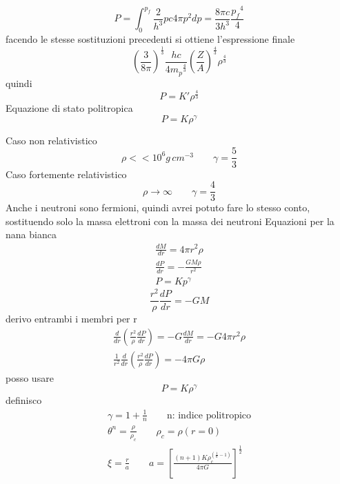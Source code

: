 \begin{enumerate}
\begin{equation*}
        P = \int_0^{p_f} \frac{2}{h^3}pc4\pi p^2 dp = \frac{8\pi c}{3h^3}\frac{{p_f}^4}{4}
    \end{equation*}
    facendo le stesse sostituzioni precedenti si ottiene l'espressione finale
    \begin{equation*}
        {\left(\frac{3}{8\pi}\right)}^{\frac{1}{3}}\frac{hc}{4{m_p}^{\frac{4}{3}}} {\left(\frac{Z}{A}\right)}^{\frac{4}{3}} \rho^{\frac{4}{3}}
    \end{equation*}
    quindi
    \begin{equation*}
        P = K' \rho^{\frac{4}{3}}
    \end{equation*}
    Equazione di stato politropica
    \begin{equation*}
        P = K \rho^\gamma
    \end{equation*}
\end{enumerate}
Caso non relativistico
\begin{equation*}
    \rho << 10^6 g \,  cm^{-3} \qquad \gamma = \frac{5}{3}
\end{equation*}
Caso fortemente relativistico
\begin{equation*}
    \rho \to \infty \qquad \gamma = \frac{4}{3}
\end{equation*}
Anche i neutroni sono fermioni, quindi avrei potuto fare lo stesso conto, sostituendo solo la massa elettroni con la massa dei neutroni \newline
Equazioni per la nana bianca 
\begin{gather*}
     \frac{dM}{dr} = 4\pi r^2 \rho \\
     \frac{dP}{dr} = - \frac{GM\rho}{r^2} \\
     P = Kp^\gamma
\end{gather*}
\begin{equation*}
    \frac{r^2}{\rho}\frac{dP}{dr}= -GM
\end{equation*}
derivo entrambi i membri per r
\begin{gather*}
    \frac{d}{dr}\left(\frac{r^2}{\rho}\frac{dP}{dr}\right) = -G \frac{dM}{dr} = -G 4\pi r^2 \rho  \\
    \frac{1}{r^2}\frac{d}{dr} \left(\frac{r^2}{\rho} \frac{dP}{dr}\right) = -4\pi G \rho
\end{gather*}
posso usare
\begin{equation*}
    P = K \rho^\gamma 
\end{equation*}
definisco
\begin{gather*}
    \gamma = 1 + \frac{1}{n}  \qquad \mbox{n: indice politropico}\\
    \theta^n = \frac{\rho}{\rho_c} \qquad \rho_c = \rho(r=0) \\
    \xi = \frac{r}{a} \qquad a = {\left[\frac{(n+1)K\rho_c^{\left(\frac{1}{n}-1\right)}}{4\pi G}\right]}^{\frac{1}{2}}
\end{gather*}
